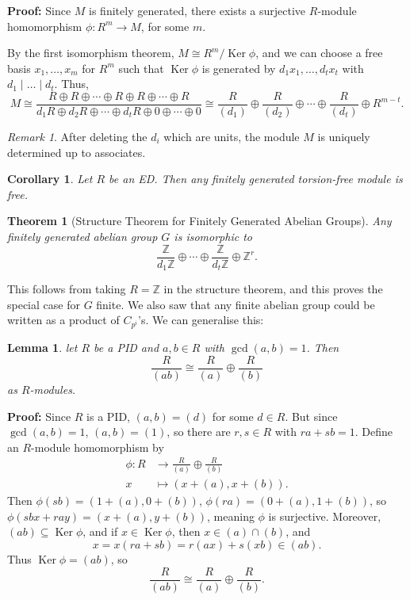 \documentclass[12pt]{article}
\DeclareMathOperator{\Ker}{Ker}
\newtheorem{theorem}{Theorem}[section]
\newtheorem{corollary}{Corollary}[section]
\newtheorem{lemma}{Lemma}[section]
\theoremstyle{definition}
\theoremstyle{remark}
\newtheorem*{remark}{Remark}
\begin{document}
\begin{adjustbox}{minipage = \columnwidth - 25.5pt, margin=1em, frame=1pt, margin=0em}
	\textbf{Proof:} Since $M$ is finitely generated, there exists a surjective $R$-module homomorphism $\phi : R^{m} \to M$, for some $m$. 

	By the first isomorphism theorem, $M \cong R^{m} / \Ker \phi$, and we can choose a free basis $x_1, \ldots, x_m$ for $R^{m}$ such that $\Ker \phi$ is generated by $d_1x_1, \ldots, d_tx_t$ with $d_1 \mid \ldots \mid d_t$. Thus,
	\[
		M \cong \frac{R \oplus R \oplus \cdots \oplus R \oplus R \oplus \cdots \oplus R}{d_1R \oplus d_2R \oplus \cdots \oplus d_tR \oplus 0 \oplus \cdots \oplus 0} \cong \frac{R}{(d_1)} \oplus \frac{R}{(d_2)} \oplus \cdots \oplus \frac{R}{(d_t)} \oplus R^{m - t}
	.\]
\end{adjustbox}

\begin{remark}
	After deleting the $d_i$ which are units, the module $M$ is uniquely determined up to associates.
\end{remark}

\begin{corollary}
	Let $R$ be an ED. Then any finitely generated torsion-free module is free.
\end{corollary}

\begin{theorem}[Structure Theorem for Finitely Generated Abelian Groups]
	Any finitely generated abelian group $G$ is isomorphic to
	\[
	\frac{\mathbb{Z}}{d_1 \mathbb{Z}} \oplus \cdots \oplus \frac{\mathbb{Z}}{d_t \mathbb{Z}} \oplus \mathbb{Z}^{r}
	.\]
\end{theorem}

This follows from taking $R = \mathbb{Z}$ in the structure theorem, and this proves the special case for $G$ finite. We also saw that any finite abelian group could be written as a product of $C_{p^{i}}$'s. We can generalise this:

\begin{lemma}
	let $R$ be a PID and $a, b \in R$ with $\gcd(a, b) = 1$. Then
	\[
		\frac{R}{(ab)} \cong \frac{R}{(a)} \oplus \frac{R}{(b)}
	\]
	as $R$-modules.
\end{lemma}

\begin{adjustbox}{minipage = \columnwidth - 25.5pt, margin=1em, frame=1pt, margin=0em}
	\textbf{Proof:} Since $R$ is a PID, $(a, b) = (d)$ for some $d \in R$. But since $\gcd(a, b) = 1$, $(a, b) = (1)$, so there are $r, s \in R$ with $ra + sb = 1$. Define an $R$-module homomorphism by
	\begin{align*}
		\phi : R &\to \frac{R}{(a)} \oplus \frac{R}{(b)} \\
		x &\mapsto (x + (a), x + (b)).
	\end{align*}
	Then $\phi(sb) = (1 + (a), 0 + (b))$, $\phi(ra) = (0 + (a), 1 + (b))$, so $\phi(sbx + ray) = (x + (a), y + (b))$, meaning $\phi$ is surjective. Moreover, $(ab) \subseteq \Ker \phi$, and if $x \in \Ker \phi$, then $x \in (a) \cap (b)$, and
	\[
		x = x(ra + sb) = r(ax) + s(xb) \in (ab)
	.\]
	Thus $\Ker \phi = (ab)$, so
	\[
		\frac{R}{(ab)} \cong \frac{R}{(a)} \oplus \frac{R}{(b)}
	.\]
\end{adjustbox}
\end{document}
